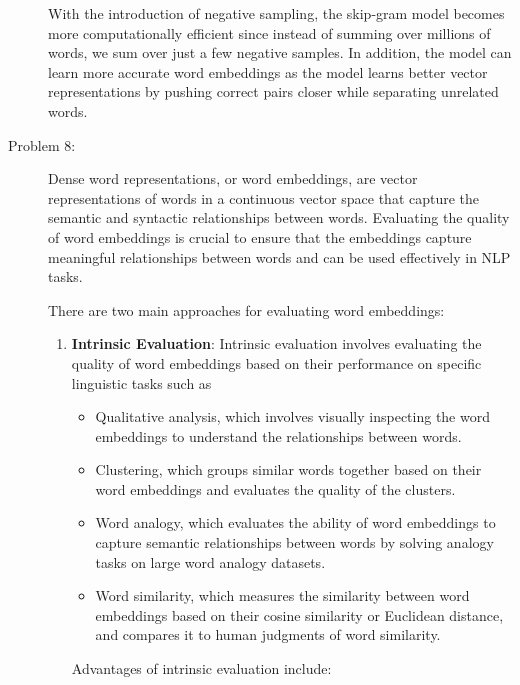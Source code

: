 \documentclass[12pt]{article}
\begin{document}
\begin{description}
  With the introduction of negative sampling, the skip-gram model becomes more computationally efficient since instead of summing over millions of words, 
  we sum over just a few negative samples. In addition, the model can learn more accurate word embeddings as the model learns better vector representations by pushing correct 
  pairs closer while separating unrelated words.

  \pagebreak

  \item[Problem 8:] \hfill %
  
  Dense word representations, or word embeddings, are vector representations of words in a continuous vector space that capture the semantic and syntactic relationships between 
  words.
  Evaluating the quality of word embeddings is crucial to ensure that the embeddings capture meaningful relationships between words and can be used effectively in NLP tasks.

  There are two main approaches for evaluating word embeddings:

  \begin{enumerate}
    \item \textbf{Intrinsic Evaluation}: Intrinsic evaluation involves evaluating the quality of word embeddings based on their performance on specific linguistic tasks such as
    
    \begin{itemize}
      \item Qualitative analysis, which involves visually inspecting the word embeddings to understand the relationships between words.
      \item Clustering, which groups similar words together based on their word embeddings and evaluates the quality of the clusters.
      \item Word analogy, which evaluates the ability of word embeddings to capture semantic relationships between words by solving analogy tasks on large word analogy datasets.
      \item Word similarity, which measures the similarity between word embeddings based on their cosine similarity or Euclidean distance, and compares it to human judgments of word similarity.
    \end{itemize}

    Advantages of intrinsic evaluation include:


\end{enumerate}
\end{description}
\end{document}

